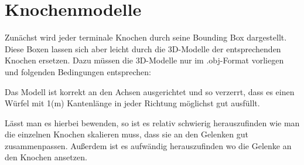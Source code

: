 \section{Knochenmodelle}
\label{bone_models}

Zunächst wird jeder terminale Knochen durch seine Bounding Box dargestellt.
Diese Boxen lassen sich aber leicht durch die 3D-Modelle der entsprechenden Knochen ersetzen. Dazu müssen die 3D-Modelle nur im .obj-Format vorliegen und folgenden Bedingungen entsprechen:

Das Modell ist korrekt an den Achsen ausgerichtet und so verzerrt, dass es einen Würfel mit 1(m) Kantenlänge in jeder Richtung möglichst gut ausfüllt.

Lässt man es hierbei bewenden, so ist es relativ schwierig herauszufinden wie man die einzelnen Knochen skalieren muss, dass sie an den Gelenken gut zusammenpassen. Außerdem ist es aufwändig herauszufinden wo die Gelenke an den Knochen ansetzen.

